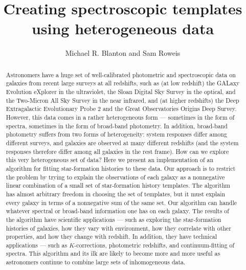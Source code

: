 \documentclass[10pt]{aastex}
\newcounter{address}
\begin{document}
\title{ Creating spectroscopic templates using heterogeneous data}

\author{
Michael R. Blanton\altaffilmark{\ref{NYU}} and 
Sam Roweis\altaffilmark{\ref{NYU}}}

\setcounter{address}{1}
\clearpage

\begin{abstract}
Astronomers have a huge set of well-calibrated photometric and
spectroscopic data on galaxies from recent large surveys at all
redshifts, such as (at low redshift) the GALaxy Evolution eXplorer in
the ultraviolet, the Sloan Digital Sky Survey in the optical, and the
Two-Micron All Sky Survey in the near infrared, and (at higher
redshifts) the Deep Extragalactic Evolutionary Probe 2 and the Great
Observatories Origins Deep Survey.  However, this data comes in a
rather heterogeneous form --- sometimes in the form of spectra,
sometimes in the form of broad-band photometry. In addition,
broad-band photometry suffers from two forms of heterogeneity: system
responses differ among different surveys, and galaxies are observed at
many different redshifts (and the system responses therefore differ
among all galaxies in the rest frame).  How can we explore this very
heterogeneous set of data?  Here we present an implementation of an
algorithm for fitting star-formation histories to these data. Our
approach is to restrict the problem by trying to explain the
observations of each galaxy as a nonnegative linear combination of a
small set of star-formation history templates.  The algorithm has
almost arbitrary freedom in choosing the set of templates, but it must
explain every galaxy in terms of a nonnegative sum of the same set.
Our algorithm can handle whatever spectral or broad-band information
one has on each galaxy.  The results of the algorithm have scientific
applications --- such as exploring the star-formation histories of
galaxies, how they vary with environment, how they correlate with
other properties, and how they change with redshift. In addition, they
have technical applications --- such as $K$-corrections, photometric
redshifts, and continuum-fitting of spectra. This algorithm and its
ilk are likely to become more and more useful as astronomers continue
to combine large sets of inhomogeneous data.
\end{abstract}

\end{document}
